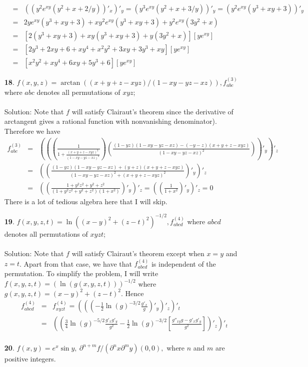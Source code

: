 \documentclass[12pt]{amsbook}
\begin{document}
\begin{enumerate}
\begin{eqnarray*}
&=&((y^2e^{xy}(y^2+x+2/y))'_x)'_y=(y^3e^{xy}(y^2+x+3/y))'_y =(y^2e^{xy}(y^3+xy+3))'_y \\
&=&2ye^{xy}(y^3+xy+3)+xy^2e^{xy}(y^3+xy+3)+y^2e^{xy}(3y^2+x) \\
&=&[2(y^3+xy+3)+xy(y^3+xy+3)+y(3y^2+x)][ye^{xy}] \\
&=&[2y^3+2xy+6+xy^4+x^2y^2+3xy+3y^3+xy][ye^{xy}] \\
&=&[x^2y^2+xy^4+6xy+5y^3+6][ye^{xy}]
\end{eqnarray*}
\item[{\small\bf 18}.] $f(x,y,z)=\arctan((x+y+z-xyz)/(1-xy-yz-xz)), f^{(3)}_{abc}$ where $abc$ denotes all permutations of $xyz$;
\\
\\
{\sc Solution}: Note that $f$ will satisfy Clairaut's theorem since the derivative of arctangent gives a rational function with nonvanishing denominator). Therefore we have
\begin{eqnarray*}
f^{(3)}_{abc}&=&(((\frac{1}{1+\frac{(x+y+z-xyz)^2}{(1-xy-yz-xz)^2}})(\frac{(1-yz)(1-xy-yz-xz)-(-y-z)(x+y+z-xyz)}{(1-xy-yz-xz)^2}))'_y)'_z \\
&=&((\frac{(1-yz)(1-xy-yz-xz)+(y+z)(x+y+z-xyz)}{(1-xy-yz-xz)^2+(x+y+z-xyz)^2})'_y)'_z \\
&=&((\frac{1+y^2z^2+y^2+z^2}{(1+y^2z^2+y^2+z^2)(1+x^2)})'_y)'_z=((\frac{1}{1+x^2})'_y)'_z=0
\end{eqnarray*}
There is a lot of tedious algebra here that I will skip.
\item[{\small\bf 19}.] $f(x,y,z,t)=\ln((x-y)^2+(z-t)^2)^{-1/2}, f^{(4)}_{abcd}$ where $abcd$ denotes all permutations of $xyzt$;
\\
\\
{\sc Solution}: Note that $f$ will satisfy Clairaut's theorem except when $x=y$ and $z=t$. Apart from that case, we have that $f^{(4)}_{abcd}$ is independent of the permutation. To simplify the problem, I will write $f(x,y,z,t)=(\ln(g(x,y,z,t)))^{-1/2}$ where $g(x,y,z,t)=(x-y)^2+(z-t)^2$.
Hence
\begin{eqnarray*}
f^{(4)}_{abcd}&=&f^{(4)}_{xyzt}= (((-\frac{1}{2}\ln(g)^{-3/2}\frac{g'_x}{g})'_y)'_z)'_t \\
&=&((\frac{3}{4}\ln(g)^{-5/2}\frac{g'_xg'_y}{g^2}-\frac{1}{2}\ln(g)^{-3/2}[\frac{g''_{xy}g-g'_xg'_y}{g^2}])'_z)'_t \\
\end{eqnarray*}
\item[{\small\bf 20}.] $f(x,y)=e^x\sin y, \ \partial^{n+m}f/(\partial^n x \partial^m y)(0,0),$ where $n$ and $m$ are positive integers.

\end{enumerate}
\end{document}

